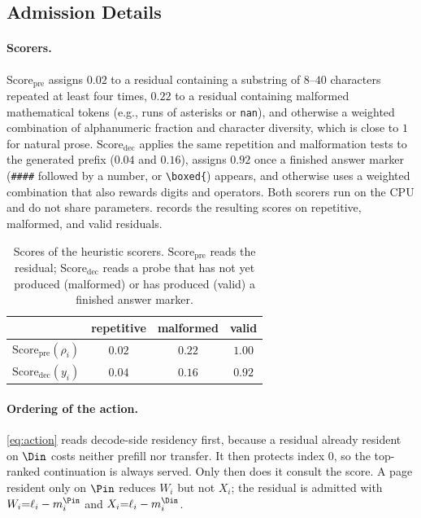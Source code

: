 \subsection{Admission Details}
\label{sec:app-detail}

\paragraph{Scorers.}
$\mathrm{Score}_{\mathrm{pre}}$ assigns $0.02$ to a residual containing a substring of $8$--$40$ characters repeated at least four times, $0.22$ to a residual containing malformed mathematical tokens (e.g., runs of asterisks or \texttt{nan}), and otherwise a weighted combination of alphanumeric fraction and character diversity, which is close to $1$ for natural prose.
$\mathrm{Score}_{\mathrm{dec}}$ applies the same repetition and malformation tests to the generated prefix ($0.04$ and $0.16$), assigns $0.92$ once a finished answer marker (\texttt{\#\#\#\#} followed by a number, or \texttt{\textbackslash boxed\{}) appears, and otherwise uses a weighted combination that also rewards digits and operators.
Both scorers run on the CPU and do not share parameters.
 records the resulting scores on repetitive, malformed, and valid residuals.

\begin{table}[t]
\centering
\caption{Scores of the heuristic scorers.
$\mathrm{Score}_{\mathrm{pre}}$ reads the residual; $\mathrm{Score}_{\mathrm{dec}}$ reads a probe that has not yet produced (malformed) or has produced (valid) a finished answer marker.}
\label{tab:scores}
\scriptsize
\setlength{\tabcolsep}{4pt}
\begin{tabular}{@{}lccc@{}}
\toprule
 & repetitive & malformed & valid \\
\midrule
$\mathrm{Score}_{\mathrm{pre}}(\rho_i)$ & $0.02$ & $0.22$ & $1.00$ \\
$\mathrm{Score}_{\mathrm{dec}}(y_i)$ & $0.04$ & $0.16$ & $0.92$ \\
\bottomrule
\end{tabular}
\end{table}

\paragraph{Ordering of the action.}
\eqref{eq:action} reads decode-side residency first, because a residual already resident on $\Din$ costs neither prefill nor transfer.
It then protects index $0$, so the top-ranked continuation is always served.
Only then does it consult the score.
A page resident only on $\Pin$ reduces $W_i$ but not $X_i$; the residual is admitted with $W_i{=}\ell_i-m_i^{\Pin}$ and $X_i{=}\ell_i-m_i^{\Din}$.

